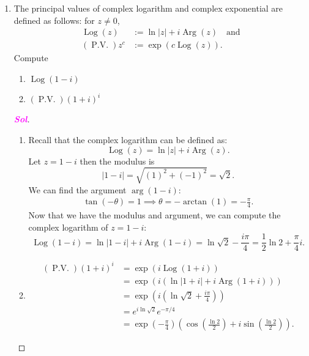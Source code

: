 \documentclass{article}
\theoremstyle{definition}
\newcommand{\Log}{\operatorname{Log}}
\newcommand{\Arg}{\operatorname{Arg}}
\newcommand{\pv}{\operatorname{P.V.}}
\newcommand{\of}[1]{\left( #1 \right)}
\newcommand{\abs}[1]{\left\lvert #1 \right\rvert}
\newcommand{\sol}{\textcolor{magenta}{\bf Sol}}
\begin{document}
\begin{enumerate}
	\item The principal values of complex logarithm and complex exponential are defined as follows: for $z\neq 0$,
	\begin{align*}
		\Log\of{z} &:=\ln\abs{z}+i\Arg\of{z}\quad\text{and}\\
		\of{\pv}z^c &:=\exp\of{c\Log\of{z}}.
	\end{align*} Compute \begin{enumerate}
		\item $\Log\of{1-i}$ 
		\item $\of{\pv}\of{1+i}^i$
	\end{enumerate}
	\begin{proof}[\sol]
		\begin{enumerate}
			\item Recall that the complex logarithm can be defined as:
			\[\Log(z) = \ln|z| + i\Arg(z).
			\]
			Let $z = 1-i$ then the modulus is
			\[|1-i| = \sqrt{(1)^2 + (-1)^2} = \sqrt{2}.\]
			We can find the argument $\arg(1-i)$: \begin{align*}
				\tan(-\theta)=1\implies\theta=-\arctan\of{1}=-\frac{\pi}{4}.
			\end{align*}
			Now that we have the modulus and argument, we can compute the complex logarithm of $z = 1 - i$:
			\[
			\Log(1-i) = \ln|1-i| + i\Arg(1-i) = \ln\sqrt{2} - \frac{i\pi}{4}=\frac{1}{2}\ln 2+\frac{\pi}{4}i.
			\]
			\vspace{4pt}
			\item \begin{align*}
				\of{\pv}\of{1+i}^i &=\exp\of{i\Log\of{1+i}}\\
				&=\exp\of{i\of{\ln\abs{1+i}+i\Arg\of{1+i}}}\\
				&=\exp\of{i\of{\ln\sqrt{2}+\frac{i\pi}{4}}}\\
				&=e^{i\ln\sqrt{2}}e^{-\pi/4}\\
				&=\exp\of{-\frac{\pi}{4}}\of{\cos\of{\frac{\ln 2}{2}}+i\sin\of{\frac{\ln 2}{2}}}.
			\end{align*}
		\end{enumerate}
	\end{proof}
	

\end{enumerate}
\end{document}
